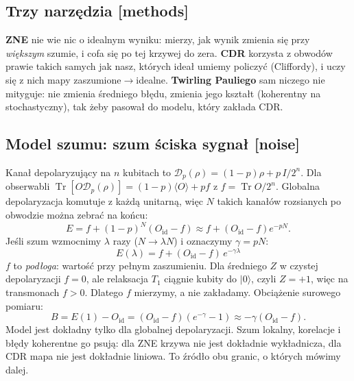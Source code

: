 \documentclass[11pt,a4paper]{article}
\newcommand{\slid}[1]{\hfill{\normalfont\small\ttfamily\color{axbluedk}[#1]}}
\newcommand{\ev}[1]{\langle #1\rangle}
\newcommand{\ket}[1]{|#1\rangle}
\newcommand{\Oid}{O_{\mathrm{id}}}
\newcommand{\Tr}{\operatorname{Tr}}
\begin{document}
\subsection{Trzy narzędzia \slid{methods}}

\textbf{ZNE} nie wie nic o idealnym wyniku: mierzy, jak wynik zmienia się przy \emph{większym}
szumie, i cofa się po tej krzywej do zera. \textbf{CDR} korzysta z obwodów prawie takich
samych jak nasz, których ideał umiemy policzyć (Cliffordy), i uczy się z nich mapy
zaszumione$\to$idealne. \textbf{Twirling Pauliego} sam niczego nie mityguje: nie zmienia
średniego błędu, zmienia jego kształt (koherentny na stochastyczny), tak żeby pasował do modelu,
który zakłada CDR.

\subsection{Model szumu: szum ściska sygnał \slid{noise}}

Kanał depolaryzujący na $n$ kubitach to $\mathcal D_p(\rho)=(1-p)\rho+p\,I/2^n$. Dla
obserwabli $\Tr[O\mathcal D_p(\rho)]=(1-p)\ev{O}+p f$ z $f=\Tr O/2^n$. Globalna depolaryzacja
komutuje z każdą unitarną, więc $N$ takich kanałów rozsianych po obwodzie można zebrać na
końcu:
\[
  E=f+(1-p)^N(\Oid-f)\approx f+(\Oid-f)e^{-pN}.
\]
Jeśli szum wzmocnimy $\lambda$ razy ($N\to\lambda N$) i oznaczymy $\gamma=pN$:
\[
  \boxed{E(\lambda)=f+(\Oid-f)\,e^{-\gamma\lambda}}
\]
$f$ to \emph{podłoga}: wartość przy pełnym zaszumieniu. Dla średniego $Z$ w czystej
depolaryzacji $f=0$, ale relaksacja $T_1$ ciągnie kubity do $\ket0$, czyli $Z=+1$, więc na
transmonach $f>0$. Dlatego $f$ mierzymy, a nie zakładamy. Obciążenie surowego pomiaru:
\[
  B=E(1)-\Oid=(\Oid-f)(e^{-\gamma}-1)\approx-\gamma(\Oid-f).
\]
Model jest dokładny tylko dla globalnej depolaryzacji. Szum lokalny, korelacje i błędy
koherentne go psują: dla ZNE krzywa nie jest dokładnie wykładnicza, dla CDR mapa nie jest
dokładnie liniowa. To źródło obu granic, o których mówimy dalej.

\begin{center}
\end{center}
\end{document}
